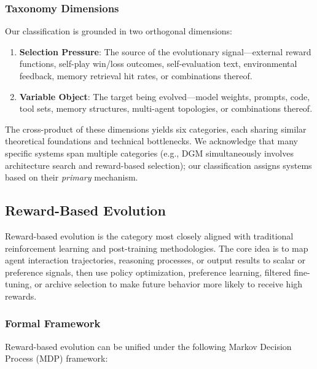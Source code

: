 \subsubsection{Taxonomy Dimensions}

Our classification is grounded in two orthogonal dimensions:

\begin{enumerate}
\item \textbf{Selection Pressure}: The source of the evolutionary signal---external reward functions, self-play win/loss outcomes, self-evaluation text, environmental feedback, memory retrieval hit rates, or combinations thereof.
\item \textbf{Variable Object}: The target being evolved---model weights, prompts, code, tool sets, memory structures, multi-agent topologies, or combinations thereof.
\end{enumerate}

The cross-product of these dimensions yields six categories, each sharing similar theoretical foundations and technical bottlenecks. We acknowledge that many specific systems span multiple categories (e.g., DGM simultaneously involves architecture search and reward-based selection); our classification assigns systems based on their \emph{primary} mechanism.

\subsection{Reward-Based Evolution}\label{sec:reward}

Reward-based evolution is the category most closely aligned with traditional reinforcement learning and post-training methodologies. The core idea is to map agent interaction trajectories, reasoning processes, or output results to scalar or preference signals, then use policy optimization, preference learning, filtered fine-tuning, or archive selection to make future behavior more likely to receive high rewards.

\subsubsection{Formal Framework}

Reward-based evolution can be unified under the following Markov Decision Process (MDP) framework:

